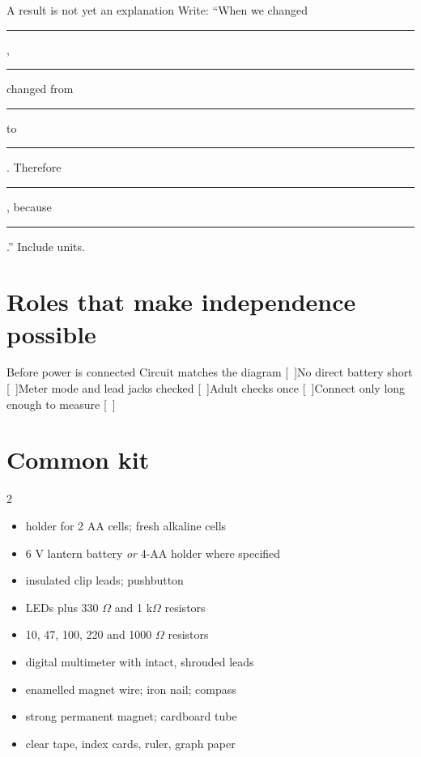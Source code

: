 \begin{telospanel}{A result is not yet an explanation}
Write: “When we changed \rule{2.6cm}{0.3pt}, \rule{2.6cm}{0.3pt}
changed from \rule{1.5cm}{0.3pt} to \rule{1.5cm}{0.3pt}. Therefore
\rule{4cm}{0.3pt}, because \rule{5cm}{0.3pt}.” Include units.
\end{telospanel}

\section{Roles that make independence possible}
\begin{telosfacts}[0.22]
\end{telosfacts}

\begin{gate}{Before power is connected}
Circuit matches the diagram [\ ]\quad No direct battery short
[\ ]\quad Meter mode and lead jacks checked [\ ]\quad Adult
checks once [\ ]\quad Connect only long enough to measure [\ ]
\end{gate}

\section{Common kit}
\begin{multicols}{2}
\begin{itemize}
\item holder for 2 AA cells; fresh alkaline cells
\item 6 V lantern battery \emph{or} 4-AA holder where specified
\item insulated clip leads; pushbutton
\item LEDs plus 330 \(\Omega\) and 1 k\(\Omega\) resistors
\item 10, 47, 100, 220 and 1000 \(\Omega\) resistors
\item digital multimeter with intact, shrouded leads
\item enamelled magnet wire; iron nail; compass
\item strong permanent magnet; cardboard tube
\item clear tape, index cards, ruler, graph paper
\end{itemize}
\end{multicols}


